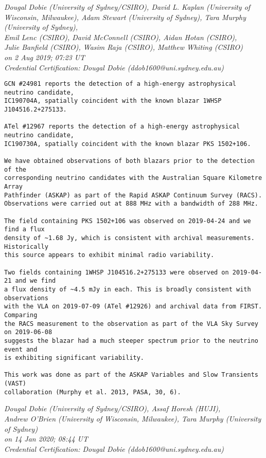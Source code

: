 \begin{center}
\textit{Dougal Dobie (University of Sydney/CSIRO), David L. Kaplan (University of Wisconsin, Milwaukee), Adam Stewart (University of Sydney), Tara Murphy (University of Sydney),\\
Emil Lenc (CSIRO), David McConnell (CSIRO), Aidan Hotan (CSIRO),\\
Julie Banfield (CSIRO), Wasim Raja (CSIRO), Matthew Whiting (CSIRO)\\
on 2 Aug 2019; 07:23 UT\\
Credential Certification: Dougal Dobie (ddob1600@uni.sydney.edu.au)}
\end{center}
\begin{verbatim}
GCN #24981 reports the detection of a high-energy astrophysical neutrino candidate,
IC190704A, spatially coincident with the known blazar 1WHSP J104516.2+275133.

ATel #12967 reports the detection of a high-energy astrophysical neutrino candidate,
IC190730A, spatially coincident with the known blazar PKS 1502+106.

We have obtained observations of both blazars prior to the detection of the
corresponding neutrino candidates with the Australian Square Kilometre Array
Pathfinder (ASKAP) as part of the Rapid ASKAP Continuum Survey (RACS).
Observations were carried out at 888 MHz with a bandwidth of 288 MHz.

The field containing PKS 1502+106 was observed on 2019-04-24 and we find a flux
density of ~1.68 Jy, which is consistent with archival measurements. Historically
this source appears to exhibit minimal radio variability.

Two fields containing 1WHSP J104516.2+275133 were observed on 2019-04-21 and we find
a flux density of ~4.5 mJy in each. This is broadly consistent with observations
with the VLA on 2019-07-09 (ATel #12926) and archival data from FIRST. Comparing
the RACS measurement to the observation as part of the VLA Sky Survey on 2019-06-08
suggests the blazar had a much steeper spectrum prior to the neutrino event and
is exhibiting significant variability.

This work was done as part of the ASKAP Variables and Slow Transients (VAST)
collaboration (Murphy et al. 2013, PASA, 30, 6).
\end{verbatim}
\pagebreak
{}
\begin{center}
\textit{ Dougal Dobie (University of Sydney/CSIRO), Assaf Horesh (HUJI),\\
Andrew O'Brien (University of Wisconsin, Milwaukee), Tara Murphy (University of Sydney)\\
on 14 Jan 2020; 08:44 UT\\
Credential Certification: Dougal Dobie (ddob1600@uni.sydney.edu.au)}
\end{center}
